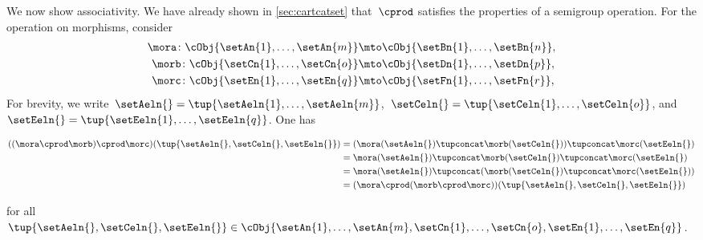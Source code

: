 \begin{example}
    We now show associativity.
    We have already shown in \cref{sec:cartcatset} that~$\cprod$ satisfies the properties of a semigroup operation.
    For the operation on morphisms, consider
    \begin{equation*}
        \begin{aligned}
            \mora\colon \cObj{\setAn{1},\ldots,\setAn{m}} & \mto \cObj{\setBn{1}, \ldots, \setBn{n}}, \\
            \morb\colon \cObj{\setCn{1},\ldots,\setCn{o}} & \mto \cObj{\setDn{1},\ldots,\setDn{p}}, \\
            \morc\colon \cObj{\setEn{1},\ldots,\setEn{q}} & \mto \cObj{\setFn{1},\ldots,\setFn{r}},
        \end{aligned}
    \end{equation*}
    For brevity, we write~$\setAeln{}=\tup{\setAeln{1},\ldots, \setAeln{m}}$,~$\setCeln{}=\tup{\setCeln{1},\ldots, \setCeln{o}}$, and~$\setEeln{}=\tup{\setEeln{1},\ldots,\setEeln{q}}$.
    One has
    \begin{widepar}
        \begin{equation*}
            \begin{aligned}
                ((\mora \cprod \morb)\cprod \morc)(\tup{\setAeln{}, \setCeln{},\setEeln{}})
                 & =(\mora(\setAeln{})\tupconcat \morb(\setCeln{}))\tupconcat \morc(\setEeln{}) \\
                 & =\mora(\setAeln{})\tupconcat \morb(\setCeln{})\tupconcat \morc(\setEeln{}) \\
                 & =\mora(\setAeln{})\tupconcat (\morb(\setCeln{})\tupconcat \morc(\setEeln{})) \\
                 & =(\mora \cprod (\morb\cprod \morc))(\tup{\setAeln{}, \setCeln{},\setEeln{}})
            \end{aligned}
        \end{equation*}
    \end{widepar}
    for all~$\tup{\setAeln{}, \setCeln{},\setEeln{}}\in \cObj{\setAn{1},\ldots,\setAn{m},\setCn{1},\ldots,\setCn{o},\setEn{1},\ldots,\setEn{q}}$.

\end{example}


